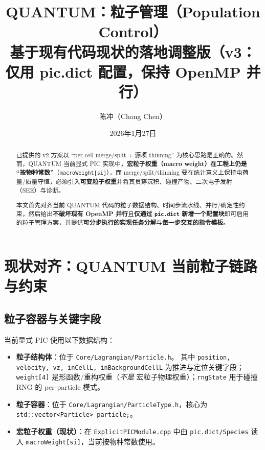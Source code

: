 \documentclass[UTF8,11pt,a4paper]{ctexart}
\title{QUANTUM：粒子管理（Population Control）\\
{\large 基于现有代码现状的落地调整版（v3：仅用 pic.dict 配置，保持 OpenMP 并行）}}
\author{陈冲（Chong Chen）}
\date{2026年1月27日}
\begin{document}
\maketitle

\begin{abstract}
已提供的 v2 方案以 ``per-cell merge/split + 源项 thinning'' 为核心思路是正确的。然而，QUANTUM 当前显式 PIC 实现中，\textbf{宏粒子权重（macro weight）在工程上仍是 ``按物种常数''}（\texttt{macroWeight[si]}），而 merge/split/thinning 要在统计意义上保持电荷量/质量守恒，必须引入\textbf{可变粒子权重}并将其贯穿沉积、碰撞产物、二次电子发射（SEE）与诊断。

本文首先对齐当前 QUANTUM 代码的粒子数据结构、时间步流水线、并行/确定性约束，然后给出\textbf{不破坏现有 OpenMP 并行}且\textbf{仅通过 \texttt{pic.dict} 新增一个配置块}即可启用的粒子管理方案，并提供\textbf{可分步执行的实现任务分解}与\textbf{每一步交互的指令模板}。
\end{abstract}

\tableofcontents

\section{现状对齐：QUANTUM 当前粒子链路与约束}

\subsection{粒子容器与关键字段}
当前显式 PIC 使用以下数据结构：
\begin{itemize}[itemsep=3pt]
  \item \textbf{粒子结构体}：位于 \texttt{Core/Lagrangian/Particle.h}。
  其中 \texttt{position, velocity, vz, inCellL, inBackgroundCellL} 为推进与定位关键字段；\texttt{weight[4]} 是形函数/重构权重（\emph{不是} 宏粒子物理权重）；\texttt{rngState} 用于碰撞 RNG 的 per-particle 模式。
  \item \textbf{粒子容器}：位于 \texttt{Core/Lagrangian/ParticleType.h}，核心为 \texttt{std::vector<Particle> particle;}。
  \item \textbf{宏粒子权重（现状）}：在 \texttt{ExplicitPICModule.cpp} 中由 \texttt{pic.dict/Species} 读入 \texttt{macroWeight[si]}，当前按物种常数使用。
\end{itemize}
\end{document}
